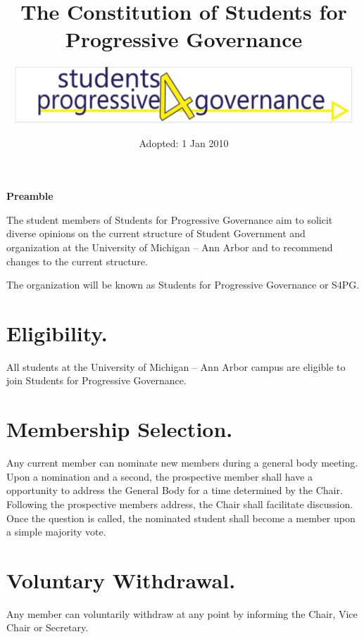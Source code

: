 \documentclass[12pt,letterpaper]{constitution}
\begin{document}
\title{The Constitution of Students for Progressive Governance}
\author{\includegraphics[width=5in]{S4PGlogo}}
\date{Adopted: 1 Jan 2010}
\maketitle
\tableofcontents
\newpage

\pagestyle{fancy}
\headheight 35pt
\thispagestyle{empty}
\linenumbers

\begin{center}
	\bfseries Preamble
\end{center}

The student members of Students for Progressive Governance aim to solicit diverse opinions on the current structure of Student Government and organization at the University of Michigan -- Ann Arbor and to recommend changes to the current structure.


The organization will be known as Students for Progressive Governance or S4PG.


\section{Eligibility.}
All students at the University of Michigan -- Ann Arbor campus are eligible to join Students for Progressive Governance.

\section{Membership Selection.}
Any current member can nominate new members during a general body meeting.  Upon a nomination and a second, the prospective member shall have a opportunity to address the General Body for a time determined by the Chair.  Following the prospective members address, the Chair shall facilitate discussion. Once the question is called, the nominated student shall become a member upon a simple majority vote.

\section{Voluntary Withdrawal.}
Any member can voluntarily withdraw at any point by informing the Chair, Vice Chair or Secretary.  
\end{document}
